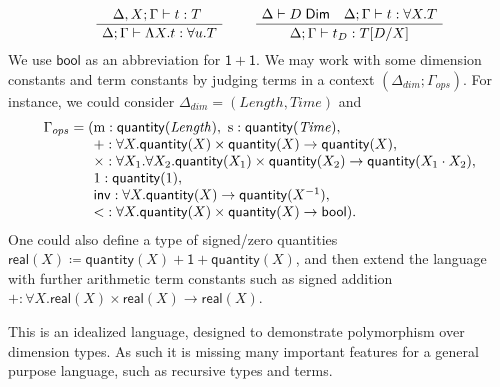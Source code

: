 \documentclass[a4paper,UKenglish]{lipics}
\newcommand{\msf}[1]{\mathsf{#1}} %
\newcommand{\unitTy}{\msf{1}}
\newcommand{\qnt}{\msf{quantity}}
\newcommand{\sreal}{\msf{real}}
\newcommand{\bool}{\msf{bool}}
\newcommand{\lengthDim}{\mathit{Length}}
\newcommand{\timeDim}{\mathit{Time}}
\newcommand{\Deltadim}{\ensuremath{\Delta_{dim}}}
\newcommand{\Gammaops}{\ensuremath{\Gamma_{ops}}}
\newcommand{\Dj}[2]{#1 \vdash #2 \; \msf{ Dim}}
\newcommand{\tj}[4]{#1;#2 \vdash #3 : #4}
\newcommand{\pack}[2]{\mathsf{pack}(#1,#2)}
\newcommand{\unpack}[4]{\mathsf{unpack}\,#1\,\mathsf{as}\,(#2,#3)\,\mathsf{in}\,#4}
\newcommand{\Dim}{D}
\newcommand{\Dvar}{X}
\begin{document}
\[\begin{array}{cc}
\hspace{5mm}
\AxiomC{$\tj{\Delta,\Dvar}\Gamma tT$ }
		\UnaryInfC{$\tj \Delta  \Gamma {\Lambda \Dvar.t} {\forall u.T}$}
		\DisplayProof

&\hspace{5mm}
\AxiomC{$\Dj\Delta \Dim \quad \tj \Delta \Gamma  t{\forall \Dvar.T}$}
	\UnaryInfC{$\tj \Delta  \Gamma {t_\Dim}{T[\Dim/\Dvar]}$}
	\DisplayProof
%
\end{array}\]
%
We use $\bool$ as an abbreviation for $\unitTy + \unitTy$.
We may work with some dimension constants and term constants
by judging terms in a context $(\Deltadim;\Gammaops)$.
For instance, we could consider $\Deltadim = (\lengthDim, \timeDim)$ and
\[\begin{array}{r@{}l}\Gammaops = (
&\mathrm{m}:\qnt(\lengthDim),
\ \mathrm{s}:\qnt(\timeDim),
\\&+:\forall \Dvar. \qnt(\Dvar)\times  \qnt(\Dvar) \rightarrow \qnt(\Dvar),
\\&\times :\forall \Dvar_1. \forall \Dvar_2. \qnt(\Dvar_1)\times \qnt(\Dvar_2) \rightarrow \qnt(\Dvar_1 \cdot \Dvar_2),
\\& 1:\qnt(1),
\\&\mathsf{inv}:\forall \Dvar.\qnt(\Dvar)\to \qnt (\Dvar^{-1}),
\\& {<}:\forall \Dvar.\qnt(\Dvar)\times \qnt(\Dvar)\to \bool)\text.
\end{array}\]
%
One could also define a type of signed/zero quantities $\sreal(\Dvar)\coloneqq \qnt(\Dvar)+\unitTy+\qnt(\Dvar)$, and then extend the language with further arithmetic term constants such as signed addition $+:\forall \Dvar.\sreal(\Dvar)\times \sreal(\Dvar)\to\sreal(\Dvar)$.

This is an idealized language, designed to demonstrate polymorphism over dimension types. As such it is missing many important features for a general purpose language, such as recursive types and terms.
\end{document}
